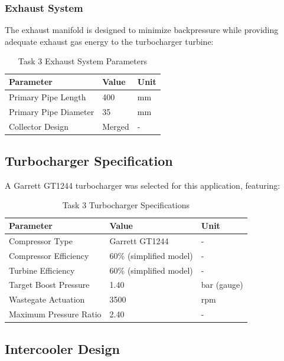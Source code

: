 \subsubsection{Exhaust System}

The exhaust manifold is designed to minimize backpressure while providing adequate exhaust gas energy to the turbocharger turbine:

\begin{table}[H]
\centering
\caption{Task 3 Exhaust System Parameters}
\label{tab:task3_exhaust}
\small
\begin{tabular}{@{}lll@{}}
\toprule
\textbf{Parameter} & \textbf{Value} & \textbf{Unit} \\
\midrule
Primary Pipe Length & 400 & mm \\
Primary Pipe Diameter & 35 & mm \\
Collector Design & Merged & - \\
\bottomrule
\end{tabular}
\end{table}

\subsection{Turbocharger Specification}

A Garrett GT1244 turbocharger was selected for this application, featuring:

\begin{table}[H]
\centering
\caption{Task 3 Turbocharger Specifications}
\label{tab:task3_turbo}
\small
\begin{tabular}{@{}lll@{}}
\toprule
\textbf{Parameter} & \textbf{Value} & \textbf{Unit} \\
\midrule
Compressor Type & Garrett GT1244 & - \\
Compressor Efficiency & 60\% (simplified model) & - \\
Turbine Efficiency & 60\% (simplified model) & - \\
Target Boost Pressure & 1.40 & bar (gauge) \\
Wastegate Actuation & 3500 & rpm \\
Maximum Pressure Ratio & 2.40 & - \\
\bottomrule
\end{tabular}
\end{table}

\subsection{Intercooler Design}

